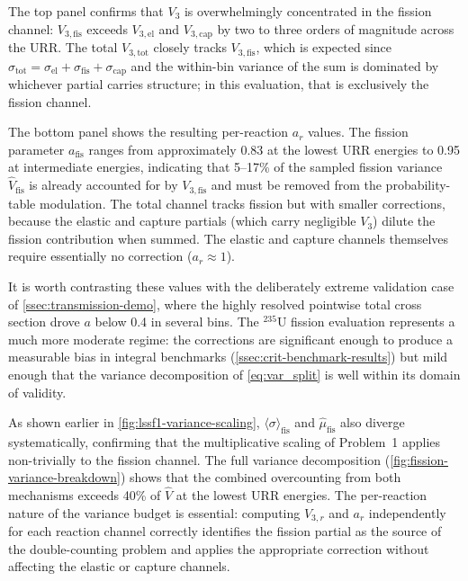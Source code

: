 \documentclass{style/nseJournal}
\newcommand{\isotope}[2]{\ensuremath{^{#1}\mathrm{#2}}}
\newcommand{\sbin}{\langle \sigma \rangle}
\begin{document}
The top panel confirms that $V_3$ is overwhelmingly concentrated in the fission channel: $V_{3,\text{fis}}$ exceeds $V_{3,\text{el}}$ and $V_{3,\text{cap}}$ by two to three orders of magnitude across the URR. The total $V_{3,\text{tot}}$ closely tracks $V_{3,\text{fis}}$, which is expected since $\sigma_{\text{tot}} = \sigma_{\text{el}} + \sigma_{\text{fis}} + \sigma_{\text{cap}}$ and the within-bin variance of the sum is dominated by whichever partial carries structure; in this evaluation, that is exclusively the fission channel.

The bottom panel shows the resulting per-reaction $a_r$ values. The fission parameter $a_{\text{fis}}$ ranges from approximately 0.83 at the lowest URR energies to 0.95 at intermediate energies, indicating that 5--17\% of the sampled fission variance $\hat{V}_{\text{fis}}$ is already accounted for by $V_{3,\text{fis}}$ and must be removed from the probability-table modulation. The total channel tracks fission but with smaller corrections, because the elastic and capture partials (which carry negligible $V_3$) dilute the fission contribution when summed. The elastic and capture channels themselves require essentially no correction ($a_r \approx 1$).

It is worth contrasting these values with the deliberately extreme validation case of \autoref{ssec:transmission-demo}, where the highly resolved pointwise total cross section drove $a$ below 0.4 in several bins. The \isotope{235}{U} fission evaluation represents a much more moderate regime: the corrections are significant enough to produce a measurable bias in integral benchmarks (\autoref{ssec:crit-benchmark-results}) but mild enough that the variance decomposition of \autoref{eq:var_split} is well within its domain of validity.

As shown earlier in \autoref{fig:lssf1-variance-scaling}, $\sbin_{\text{fis}}$ and $\hat{\mu}_{\text{fis}}$ also diverge systematically, confirming that the multiplicative scaling of Problem~1 applies non-trivially to the fission channel. The full variance decomposition (\autoref{fig:fission-variance-breakdown}) shows that the combined overcounting from both mechanisms exceeds 40\% of $\hat{V}$ at the lowest URR energies. The per-reaction nature of the variance budget is essential: computing $V_{3,r}$ and $a_r$ independently for each reaction channel correctly identifies the fission partial as the source of the double-counting problem and applies the appropriate correction without affecting the elastic or capture channels.
\end{document}
